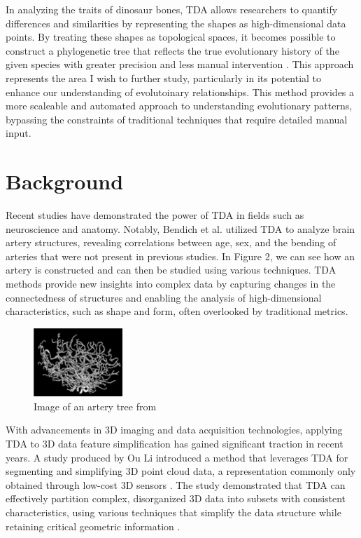 \documentclass[12pt]{article}
\begin{document}
In analyzing the traits of dinosaur bones, TDA allows researchers to quantify
differences and similarities by representing the shapes as high-dimensional data
points. By treating these shapes as topological spaces, it becomes possible to
construct a phylogenetic tree that reflects the true evolutionary history of the
given species with greater precision and less manual intervention \citep{yang2012}. 
This approach represents the area I wish to further study, particularly in its
potential to enhance our understanding of evolutoinary relationships. This method 
provides a more scaleable and automated approach to understanding 
evolutionary patterns, bypassing the constraints of traditional techniques that 
require detailed manual input.

\section{Background}
Recent studies have demonstrated the power of TDA in fields such as neuroscience
and anatomy. Notably, Bendich et al. \cite{bendich2016} utilized 
TDA to analyze brain artery structures, revealing correlations between age, sex, 
and the bending of arteries that were not present in previous studies. In Figure
2, we can see how an artery is constructed and can then be studied using various
techniques. TDA methods provide new insights into complex data by capturing changes 
in the connectedness of structures and enabling the analysis of high-dimensional 
characteristics, such as shape and form, often overlooked by traditional metrics. 

\begin{figure}
	\centering
	\includegraphics[width=0.3\textwidth]{arteryTree.png}
	\caption{Image of an artery tree from \cite{bendich2016}}
	\label{fig:artery_tree}
\end{figure}

With advancements in 3D imaging and data acquisition technologies, applying TDA 
to 3D data feature simplification has gained significant
traction in recent years. A study produced by Ou Li \cite{li2021} introduced a 
method that leverages TDA for segmenting and simplifying 3D point cloud data, a
representation commonly only obtained through low-cost 3D sensors \citep{li2021}. 
The study demonstrated that TDA can effectively partition complex, disorganized 
3D data into subsets with consistent characteristics, using various techniques 
that simplify the data structure while retaining critical geometric information
\citep{li2021}.
\end{document}

